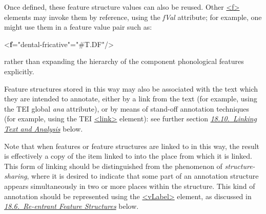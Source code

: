 Once defined, these feature structure values can also be reused. Other \hyperref[TEI.f]{<f>} elements may invoke them by reference, using the {\itshape fVal} attribute; for example, one might use them in a feature value pair such as: \par\bgroup{}\exampleFont \begin{shaded}\noindent\mbox{}{<\textbf{f}\hspace*{1em}{name}="{dental-fricative}"\hspace*{1em}{fVal}="{\#T.DF}"/>}\end{shaded}\egroup\par \noindent  rather than expanding the hierarchy of the component phonological features explicitly.\par
Feature structures stored in this way may also be associated with the text which they are intended to annotate, either by a link from the text (for example, using the TEI global {\itshape ana} attribute), or by means of stand-off annotation techniques (for example, using the TEI \hyperref[TEI.link]{<link>} element): see further section \textit{\hyperref[FSLINK]{18.10.\ Linking Text and Analysis}} below.\par
Note that when features or feature structures are linked to in this way, the result is effectively a copy of the item linked to into the place from which it is linked. This form of linking should be distinguished from the phenomenon of \textit{structure-sharing}, where it is desired to indicate that some part of an annotation structure appears simultaneously in two or more places within the structure. This kind of annotation should be represented using the \hyperref[TEI.vLabel]{<vLabel>} element, as discussed in \textit{\hyperref[FSVAR]{18.6.\ Re-entrant Feature Structures}} below.

